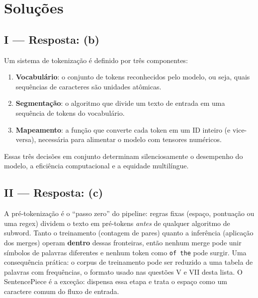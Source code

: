 \documentclass{dlproblemset}
\begin{document}
\begin{enumerate}[I)]
\end{enumerate}


\section*{Soluções}

\subsection*{I — Resposta: (b)}
Um sistema de tokenização é definido por três componentes:
\begin{enumerate}
  \item \textbf{Vocabulário}: o conjunto de tokens reconhecidos pelo modelo, ou seja,
        quais sequências de caracteres são unidades atômicas.
  \item \textbf{Segmentação}: o algoritmo que divide um texto de entrada em uma sequência
        de tokens do vocabulário.
  \item \textbf{Mapeamento}: a função que converte cada token em um ID inteiro (e vice-versa),
        necessária para alimentar o modelo com tensores numéricos.
\end{enumerate}
Essas três decisões em conjunto determinam silenciosamente o desempenho do modelo,
a eficiência computacional e a equidade multilíngue.

\subsection*{II — Resposta: (c)}
A pré-tokenização é o ``passo zero'' do pipeline: regras fixas (espaço, pontuação
ou uma regex) dividem o texto em pré-tokens \emph{antes} de qualquer algoritmo de
subword. Tanto o treinamento (contagem de pares) quanto a inferência (aplicação dos
merges) operam \textbf{dentro} dessas fronteiras, então nenhum merge pode unir
símbolos de palavras diferentes e nenhum token como \texttt{of the} pode surgir.
Uma consequência prática: o corpus de treinamento pode ser reduzido a
uma tabela de palavras com frequências, o formato usado nas questões V e VII desta
lista. O SentencePiece é a exceção: dispensa essa etapa e trata o espaço como um
caractere comum do fluxo de entrada.

\end{document}
